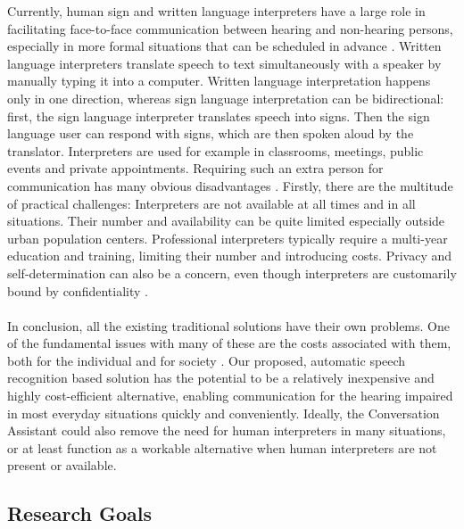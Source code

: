 \documentclass[english, 12pt, a4paper, pdftex, elec, utf8]{aaltothesis}
\begin{document}
Currently, human sign and written language interpreters have a large role in facilitating face-to-face communication between hearing and non-hearing persons, especially in more formal situations that can be scheduled in advance \cite{raino2012sisakorvaistutteen, pereira2010communication, gaur2016effects}. Written language interpreters translate speech to text simultaneously with a speaker by manually typing it into a computer. Written language interpretation happens only in one direction, whereas sign language interpretation can be bidirectional: first, the sign language interpreter translates speech into signs. Then the sign language user can respond with signs, which are then spoken aloud by the translator. Interpreters are used for example in classrooms, meetings, public events and private appointments. Requiring such an extra person for communication has many obvious disadvantages \cite{gaur2016effects}. Firstly, there are the multitude of practical challenges: Interpreters are not available at all times and in all situations. Their number and availability can be quite limited especially outside urban population centers. Professional interpreters typically require a multi-year education and training, limiting their number and introducing costs. Privacy and self-determination can also be a concern, even though interpreters are customarily bound by confidentiality \cite{pereira2010communication}. \\\\
In conclusion, all the existing traditional solutions have their own problems. One of the fundamental issues with many of these are the costs associated with them, both for the individual and for society \cite{wilson2017global}. Our proposed, automatic speech recognition based solution has the potential to be a relatively inexpensive and highly cost-efficient alternative, enabling communication for the hearing impaired in most everyday situations quickly and conveniently. Ideally, the Conversation Assistant could also remove the need for human interpreters in many situations, or at least function as a workable alternative when human interpreters are not present or available.

\subsection{Research Goals}
\end{document}
